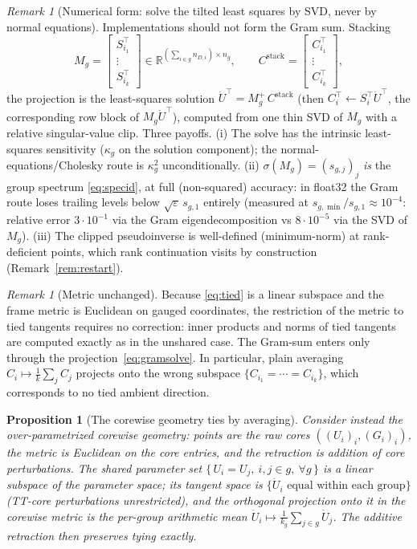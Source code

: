 \documentclass[11pt]{article}
\newtheorem{proposition}[theorem]{Proposition}
\theoremstyle{definition}
\theoremstyle{remark}
\newtheorem{remark}[theorem]{Remark}
\newcommand{\R}{\mathbb{R}}
\begin{document}
\begin{remark}[Numerical form: solve the tilted least squares by SVD, never
by normal equations]\label{rem:svdsolve}
Implementations should not form the Gram sum. Stacking
\[
M_g = \begin{bmatrix} S_{i_1}^\top \\ \vdots \\ S_{i_k}^\top \end{bmatrix}
\in \R^{(\sum_{i\in g} n_{D,i}) \times n_g},
\qquad
C^{\mathrm{stack}} = \begin{bmatrix} C_{i_1}^\top \\ \vdots \\
C_{i_k}^\top \end{bmatrix},
\]
the projection is the least-squares solution
$\dot U^\top = M_g^{+}\, C^{\mathrm{stack}}$ (then
$C_i^\top \leftarrow S_i^\top \dot U^\top$, the corresponding row block of
$M_g \dot U^\top$), computed from one thin SVD of $M_g$ with a relative
singular-value clip. Three payoffs. (i) The solve has the intrinsic
least-squares sensitivity ($\kappa_g$ on the solution component); the
normal-equations/Cholesky route is $\kappa_g^2$ unconditionally.
(ii) $\sigma(M_g) = (s_{g,j})_j$ \emph{is} the group spectrum
\eqref{eq:specid}, at full (non-squared) accuracy: in float32 the Gram route
loses trailing levels below $\sqrt{\varepsilon}\, s_{g,1}$ entirely
(measured at $s_{g,\min}/s_{g,1} \approx 10^{-4}$: relative error
$3\cdot10^{-1}$ via the Gram eigendecomposition vs $8\cdot10^{-5}$ via the
SVD of $M_g$). (iii) The clipped pseudoinverse is well-defined
(minimum-norm) at rank-deficient points, which rank continuation visits by
construction (Remark~\ref{rem:restart}).
\end{remark}

\begin{remark}[Metric unchanged]
Because \eqref{eq:tied} is a linear subspace and the frame metric is
Euclidean on gauged coordinates, the restriction of the metric to tied
tangents requires no correction: inner products and norms of tied tangents
are computed exactly as in the unshared case. The Gram-sum enters only
through the projection~\eqref{eq:gramsolve}. In particular, plain averaging
$C_i \mapsto \frac1k \sum_j C_j$ projects onto the wrong subspace
$\{C_{i_1} = \cdots = C_{i_k}\}$, which corresponds to no tied ambient
direction.
\end{remark}

\begin{proposition}[The corewise geometry ties by averaging]
\label{prop:corewise}
Consider instead the over-parametrized \emph{corewise} geometry: points are
the raw cores $((U_i)_i, (G_i)_i)$, the metric is Euclidean on the core
entries, and the retraction is addition of core perturbations. The shared
parameter set $\{\,U_i = U_j,\ i, j \in g,\ \forall g\,\}$ is a linear
subspace of the parameter space; its tangent space is
$\{\dot U_i \text{ equal within each group}\}$ (TT-core perturbations
unrestricted), and the orthogonal projection onto it in the corewise metric
is the per-group arithmetic mean
$\dot U_i \mapsto \tfrac{1}{k_g} \sum_{j \in g} \dot U_j$. The additive
retraction then preserves tying exactly.
\end{proposition}
\end{document}
